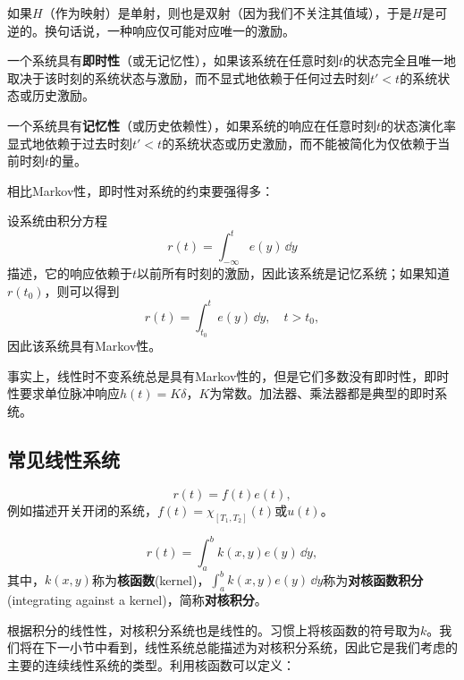 \begin{definition}[可逆性]
    \label{def:system_inversion}
    如果$H$（作为映射）是单射，则也是双射（因为我们不关注其值域），于是$H$是可逆的。换句话说，一种响应仅可能对应唯一的激励。
\end{definition}

\begin{definition}[即时性与记忆性]
    \label{def:system_memory}
    一个系统具有\textbf{即时性}（或无记忆性），如果该系统在任意时刻$t$的状态完全且唯一地取决于该时刻的系统状态与激励，而不显式地依赖于任何过去时刻$t'<t$的系统状态或历史激励。

    一个系统具有\textbf{记忆性}（或历史依赖性），如果系统的响应在任意时刻$t$的状态演化率显式地依赖于过去时刻$t'<t$的系统状态或历史激励，而不能被简化为仅依赖于当前时刻$t$的量。
\end{definition}

相比Markov性，即时性对系统的约束要强得多：

\begin{example}[积分方程]
    设系统由积分方程
    \begin{equation}
        r(t)=\int_{-\infty}^{t}e(y)\,\dd y
    \end{equation}
    描述，它的响应依赖于$t$以前所有时刻的激励，因此该系统是记忆系统；如果知道$r(t_0)$，则可以得到
    \begin{equation}
        r(t)=\int_{t_0}^{t}e(y)\,\dd y,\quad t>t_0,
    \end{equation}
    因此该系统具有Markov性。
\end{example}

事实上，线性时不变系统总是具有Markov性的，但是它们多数没有即时性，即时性要求单位脉冲响应$h(t)=K\delta$，$K$为常数。加法器、乘法器都是典型的即时系统。

\subsection{常见线性系统}\label{sub:ordinary_system}

\begin{example}[时域乘积]
    \begin{equation}
        r(t)=f(t)e(t),
    \end{equation}
    例如描述开关开闭的系统，$f(t)=\chi_{[T_1,T_2]}(t)$或$u(t)$。
\end{example}

\begin{example}[对核积分]
    \begin{equation}
        r(t)=\int_{a}^{b}k(x,y)e(y)\,\dd y,
    \end{equation}
    其中，$k(x,y)$称为\textbf{核函数}(kernel)，$\int_{a}^{b}k(x,y)e(y)\,\dd y$称为\textbf{对核函数积分}(integrating against a kernel)，简称\textbf{对核积分}。
\end{example}
根据积分的线性性，对核积分系统也是线性的。习惯上将核函数的符号取为$k$。我们将在下一小节中看到，线性系统总能描述为对核积分系统，因此它是我们考虑的主要的连续线性系统的类型。利用核函数可以定义：

